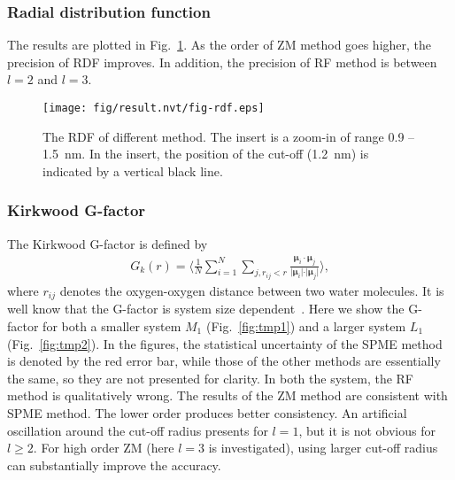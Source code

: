 \documentclass[aip,jcp,a4paper,preprint,unsortedaddress,onecolumn,fleqn]{revtex4-1}
\newcommand{\systemmb}{M_1}
\newcommand{\systemlb}{L_1}
\begin{document}
\subsubsection{Radial distribution function}
The results are plotted in Fig.~\ref{fig:rdf}. As the order of ZM method goes higher, the precision of RDF improves. In addition, the precision of RF method is between $l=2$ and $l=3$.
\begin{figure}
  \centering
  \texttt{[image: fig/result.nvt/fig-rdf.eps]}  
  \caption{The RDF of different method. The insert is a zoom-in of range 0.9 -- 1.5~nm. In the insert, the position of the cut-off (1.2~nm) is indicated by a vertical black line.}
  \label{fig:rdf}
\end{figure}


\subsubsection{Kirkwood G-factor}

The Kirkwood G-factor is defined by~\cite{vanderSpoel2006origin}
\begin{align}
  G_k(r) =
  \Big\langle
  \frac 1N
  \sum_{i=1}^N \sum_{j, r_{ij} < r}
  \frac {\boldsymbol\mu_i \cdot \boldsymbol\mu_j}{\vert \boldsymbol\mu_i\vert \cdot \vert\boldsymbol\mu_j\vert}
  \Big\rangle,
\end{align}
where $r_{ij}$ denotes the oxygen-oxygen distance between two water
molecules.  It is well know that the G-factor is system size
dependent~\cite{vanderSpoel2006origin}. Here we show the G-factor for
both a smaller system $\systemmb$ (Fig.~\ref{fig:tmp1}) and a larger system $\systemlb$
(Fig.~\ref{fig:tmp2}).  In the figures, the statistical uncertainty of
the SPME method is denoted by the red error bar, while those of the
other methods are essentially the same, so they are not presented for
clarity.  In both the system, the RF method is qualitatively
wrong. The results of the ZM method are consistent with SPME
method. The lower order produces better consistency.  An artificial
oscillation around the cut-off radius presents for $l=1$, but it is
not obvious for $l\geq 2$.  For high order ZM (here $l=3$ is investigated),
using larger cut-off radius can substantially improve the accuracy.
\end{document}
